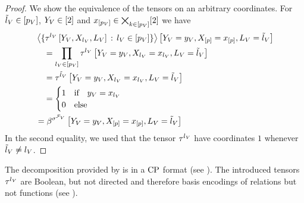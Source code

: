 \begin{proof}
    We show the equivalence of the tensors on an arbitrary coordinates.
    For $\tilde{l}_{V}\in[p_{V}]$, $Y_{V}\in[2]$ and $x_{[p_{V}]}\in\bigtimes_{k\in[p_{V}]}[2]$ we have
    \begin{align*}
        & \left\langle 
            \{\tau^{{l_{V}}}\left[Y_{V},X_{l_{V}},L_{V}\right] \,:\, l_{V}\in[p_{V}]\}
        \right\rangle \left[ Y_{V}=y_{V},X_{[p]}=x_{[p]},L_{V} = \tilde{l}_{V} \right] \\
        & \quad =
        \prod_{l_{V}\in[p_{V}]} \tau^{{l_{V}}}\left[
            Y_{V}=y_{V},X_{l_{V}}=x_{l_{V}},L_{V}=\tilde{l}_{V}
        \right] \\
        & \quad = \tau^{{\tilde{l}_{V}}}\left[
            Y_{V}=y_{V},X_{l_{V}}=x_{l_{V}},L_{V}=\tilde{l}_{V}
        \right] \\
        & \quad =
        \begin{cases}
            1 & \text{if}\quad y_{V} = x_{l_{V}} \\
            0 & \text{else}
        \end{cases} \\
        & = \beta^{\sigma^{\mathcal{F}_{V}}}\left[Y_{V}=y_{V},X_{[p]}=x_{[p]},L_{V}=\tilde{l}_{V}\right]
    \end{align*}
    In the second equality, we used that the tensor $\tau^{{l_{V}}}$ have coordinates $1$ whenever $\tilde{l}_{V}\neq l_{V}$.
\end{proof}

The decomposition provided by  is in a $\mathrm{CP}$ format (see ).
The introduced tensors $\tau^{{l_{V}}}$ are Boolean, but not directed and therefore basis encodings of relations but not functions (see ).

